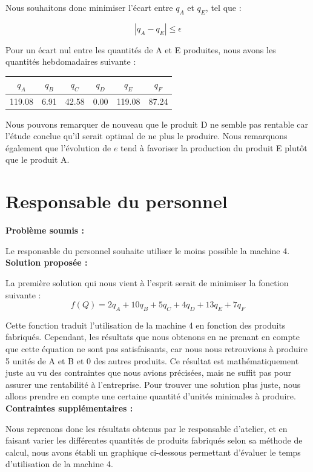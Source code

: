 \documentclass[paper=a4, fontsize=11pt]{report}
\numberwithin{equation}{section}		%
\numberwithin{figure}{section}			%
\numberwithin{table}{section}				%
\renewcommand{\bf}[1]{\textbf{#1}}
\newcommand\abs[1]{\left|#1\right|}
\begin{document}
Nous souhaitons donc minimiser l'écart entre $q_A$ et $q_E$, tel que :

\[ \abs{q_A - q_E} \leq \epsilon \] 

Pour un écart nul entre les quantités de A et E produites, nous avons les quantités hebdomadaires suivante :
\begin{center}
\begin{tabular}{cccccc}
\hline
$q_A$ & $q_B$ & $q_C$ & $q_D$ & $q_E$ & $q_F$ \\
\hline
119.08 & 6.91 & 42.58 & 0.00 & 119.08 & 87.24 \\
\hline
\end{tabular}
\end{center}

Nous pouvons remarquer de nouveau que le produit D ne semble pas rentable car l'étude conclue qu'il serait optimal de ne plus le produire. Nous remarquons également que l’évolution de $e$ tend à favoriser la production du produit E plutôt que le produit A.

\section{Responsable du personnel}
\bf{Problème soumis :}

Le responsable du personnel souhaite utiliser le moins possible la machine 4.\\

\bf{Solution proposée :}

La première solution qui nous vient à l’esprit serait de minimiser la fonction suivante : \[f(Q) = 2q_A + 10q_B + 5q_C + 4q_D + 13q_E + 7q_F\]

Cette fonction traduit l'utilisation de la machine 4 en fonction des produits fabriqués. Cependant, les résultats que nous obtenons en ne prenant en compte que cette équation ne sont pas satisfaisants, car nous nous retrouvions à produire 5 unités de A et B et 0 des autres produits. Ce résultat est mathématiquement juste au vu des contraintes que nous avions précisées, mais ne suffit pas pour assurer une rentabilité à l’entreprise. Pour trouver une solution plus juste, nous allons prendre en compte une certaine quantité d’unités minimales à produire. \\

\bf{Contraintes supplémentaires :}

Nous reprenons donc les résultats obtenus par le responsable d’atelier, et en faisant varier les différentes quantités de produits fabriqués selon sa méthode de calcul, nous avons établi un graphique ci-dessous permettant d’évaluer le temps d’utilisation de la machine 4.\\
\end{document}
